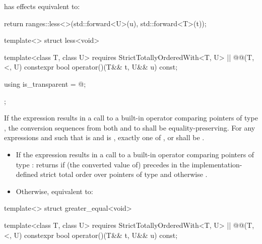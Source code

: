 {\begin{itemdescr}
\pnum
{} has effects equivalent to:
\begin{codeblock}
return ranges::less<>{}(std::forward<U>(u), std::forward<T>(t));
\end{codeblock}
\end{itemdescr}

%
\begin{itemdecl}
template<> struct less<void> {
  template<class T, class U>
    requires StrictTotallyOrderedWith<T, U> || @\textit{}@(T, <, U)
  constexpr bool operator()(T&& t, U&& u) const;

  using is_transparent = @\unspecnc@;
};
\end{itemdecl}

\begin{itemdescr}
\pnum
\oldtxt{\requires} \newtxt{\expects}
If the expression  results in a
call to a built-in operator \tcode{<} comparing pointers of type , the
conversion sequences from both  and  to  shall be
equality-preserving. For any expressions
 and  such that  is  and
 is , exactly one of ,
 or  shall be
.

\pnum
\effects
\begin{itemize}
\item
If the expression  results in a
call to a built-in operator \tcode{<} comparing pointers of type :
returns  if (the converted value of)  precedes  in
the implementation-defined strict total order over pointers of type 
and otherwise .

\item
Otherwise, equivalent to: 
\end{itemize}
\end{itemdescr}

%
\begin{itemdecl}
template<> struct greater_equal<void> {
  template<class T, class U>
    requires StrictTotallyOrderedWith<T, U> || @\textit{}@(T, <, U)
  constexpr bool operator()(T&& t, U&& u) const;

}
\end{itemdecl}}
